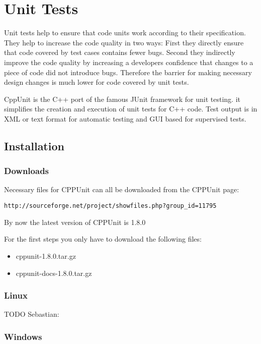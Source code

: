 \chapter{Unit Tests}

Unit tests help to ensure that code units work according to their specification.
They help to increase the code quality in two ways: First they directly 
ensure that code covered by test cases contains fewer bugs. Second they indirectly
improve the code quality by increasing a developers confidence that changes
to a piece of code did not introduce bugs. Therefore the barrier for making
necessary design changes is much lower for code covered by unit tests.
 
CppUnit is the C++ port of the famous JUnit framework for unit testing. 
it simplifies the creation and execution of unit tests for C++ code.
Test output is in XML or text format for automatic testing and GUI based for
supervised tests.

\section{Installation}

\subsection{Downloads}
Necessary files for CPPUnit can all be downloaded from the CPPUnit page:
\begin{verbatim}
http://sourceforge.net/project/showfiles.php?group_id=11795
\end{verbatim}

By now the latest version of CPPUnit is 1.8.0

For the first steps you only have to download the following files:
\begin{itemize}
\item cppunit-1.8.0.tar.gz
\item cppunit-docs-1.8.0.tar.gz
\end{itemize}

\subsection{Linux}

TODO Sebastian:

\subsection{Windows}

